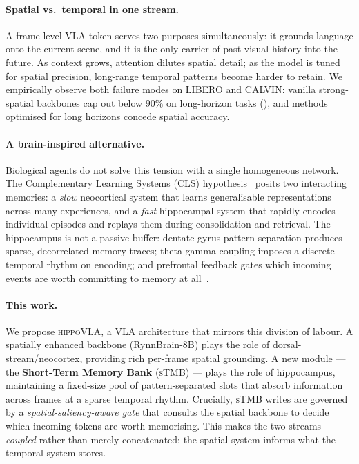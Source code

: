 \documentclass[10pt,letterpaper]{article}
\newcommand{\method}{\textsc{hippoVLA}\xspace}
\newcommand{\sTMB}{\textsc{sTMB}\xspace}
\begin{document}
\paragraph{Spatial vs.\ temporal in one stream.}
A frame-level VLA token serves two purposes simultaneously: it grounds language onto the current scene, and it is the only carrier of past visual history into the future. As context grows, attention dilutes spatial detail; as the model is tuned for spatial precision, long-range temporal patterns become harder to retain. We empirically observe both failure modes on LIBERO and CALVIN: vanilla strong-spatial backbones cap out below $90\%$ on long-horizon tasks (), and methods optimised for long horizons concede spatial accuracy.

\paragraph{A brain-inspired alternative.}
Biological agents do not solve this tension with a single homogeneous network. The Complementary Learning Systems (CLS) hypothesis~\citep{mcclelland1995cls,kumaran2016cls} posits two interacting memories: a \emph{slow} neocortical system that learns generalisable representations across many experiences, and a \emph{fast} hippocampal system that rapidly encodes individual episodes and replays them during consolidation and retrieval. The hippocampus is not a passive buffer: dentate-gyrus pattern separation produces sparse, decorrelated memory traces; theta-gamma coupling imposes a discrete temporal rhythm on encoding; and prefrontal feedback gates which incoming events are worth committing to memory at all~\citep{rolls2013mechanisms}.

\paragraph{This work.}
We propose \method, a VLA architecture that mirrors this division of labour. A spatially enhanced backbone (RynnBrain-8B) plays the role of dorsal-stream/neocortex, providing rich per-frame spatial grounding. A new module --- the \textbf{Short-Term Memory Bank} (\sTMB) --- plays the role of hippocampus, maintaining a fixed-size pool of pattern-separated slots that absorb information across frames at a sparse temporal rhythm. Crucially, \sTMB writes are governed by a \emph{spatial-saliency-aware gate} that consults the spatial backbone to decide which incoming tokens are worth memorising. This makes the two streams \emph{coupled} rather than merely concatenated: the spatial system informs what the temporal system stores.
\end{document}
